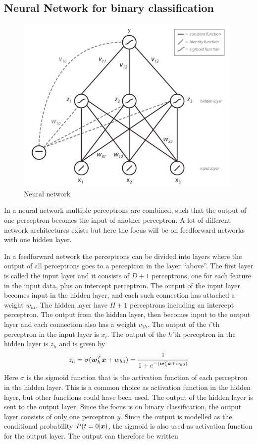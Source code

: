 \subsection{Neural Network for binary classification}
\begin{figure}[ht]
    \centering
    \includegraphics[width=110mm]{media/neural-network.pdf}
    \caption{Neural network}
    \label{fig:neural-network}
\end{figure}
In a neural network multiple perceptrons are combined, such that the output of one perceptron becomes the input of another perceptron. A lot of different network architectures exists but here the focus will be on feedforward networks with one hidden layer. \par
In a feedforward network the perceptrons can be divided into layers where the output of all perceptrons goes to a perceptron in the layer ``above''. The first layer is called the input layer and it consists of $D+1$ perceptrons, one for each feature in the input data, plus an intercept perceptron. The output of the input layer becomes input in the hidden layer, and each such connection has attached a weight $w_{hi}$. The hidden layer have $H+1$ perceptrons including an intercept perceptron. The output from the hidden layer, then becomes input to the output layer and each connection also has a weight $v_{1h}$. The output of the $i$'th perceptron in the input layer is $x_i$. The output of the $h$'th perceptron in the hidden layer is $z_h$ and is given by
\[
z_h = \sigma(\boldsymbol{w}_h^T\boldsymbol{x}+w_{h0}) = \frac{1}{1+e^{-(\boldsymbol{w}_h^T\boldsymbol{x}+w_{h0})}}
\]
Here $\sigma$ is the sigmoid function that is the activation function of each perceptron in the hidden layer. This is a common choice as activation function in the hidden layer, but other functions could have been used. The output of the hidden layer is sent to the output layer. Since the focus is on binary classification, the output layer consists of only one perceptron $y$. Since the output is modelled as the conditional probability $P(t=0|\boldsymbol{x})$, the sigmoid is also used as activation function for the output layer. The output can therefore be written
